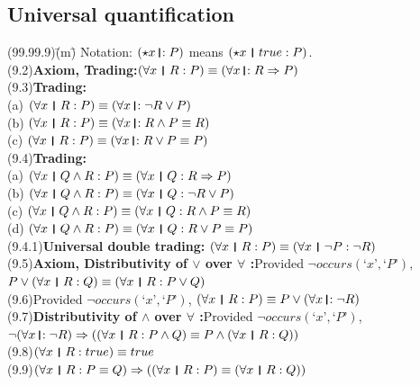 \documentclass{amsart}
\newcommand{\lgap}{2pt}                             %
\newcommand{\impl}{\ensuremath{\Rightarrow}}        %
\newcommand{\thedr}{\rule[-.25ex]{.32mm}{1.75ex}}   %
\newcommand{\dr}{\;\,\thedr\,\;}                    %
\newcommand{\rb}{:}                                 %
\newcommand{\drrb}{\;\thedr\,{:}\;}                 %
\newcommand{\all}{\forall}                          %
\newcommand{\Lq}{\mbox{`}}
\newcommand{\Rq}{\mbox{'}}
\begin{document}
\subsection*{Universal quantification}
\begin{tabbing}
(99.99.9)\;\=(m)\;\=\kill
Notation: $(\star x\drrb P)$ means $(\star x\dr true\rb P)$.\\[\lgap]
(9.2)\>\textbf{Axiom, Trading:}\quad $(\all x\dr R\rb P)\equiv (\all x\drrb R\impl P)$\\[\lgap]
(9.3)\>\textbf{Trading:}\\[\lgap]
      \> (a)\> $(\all x\dr R\rb P)\equiv (\all x\drrb \neg R\lor P)$\\[\lgap]
      \> (b)\> $(\all x\dr R\rb P)\equiv (\all x\drrb R\land P\equiv R)$\\[\lgap]
      \> (c)\> $(\all x\dr R\rb P)\equiv (\all x\drrb R\lor P\equiv P)$\\[\lgap]
(9.4)\>\textbf{Trading:}\\[\lgap]
      \> (a)\> $(\all x\dr Q\land R\rb P)\equiv (\all x\dr Q\rb R\impl P)$\\[\lgap]
      \> (b)\> $(\all x\dr Q\land R\rb P)\equiv (\all x\dr Q\rb \neg R\lor P)$\\[\lgap]
      \> (c)\> $(\all x\dr Q\land R\rb P)\equiv (\all x\dr Q\rb R\land P\equiv R)$\\[\lgap]
      \> (d)\> $(\all x\dr Q\land R\rb P)\equiv (\all x\dr Q\rb R\lor P\equiv P)$\\[\lgap]
(9.4.1)\>\textbf{Universal double trading:} \quad $(\all x\dr R\rb P)\equiv (\all x\dr \neg P \rb \neg R)$\\[\lgap]
(9.5)\>\textbf{Axiom, Distributivity of $\lor$ over $\all$ :}\quad Provided $\neg occurs(\Lq x\Rq ,\Lq P\Rq)$,\\[\lgap]
      \>$P\lor (\all x\dr R\rb Q)\equiv (\all x\dr R\rb P\lor Q)$\\[\lgap]
(9.6)\>Provided $\neg occurs(\Lq x\Rq ,\Lq P\Rq)$, \quad $(\all x\dr R\rb P)\equiv P\lor (\all x\drrb \neg R)$\\[\lgap]
(9.7)\>\textbf{Distributivity of $\land$ over $\all$ :}\quad Provided $\neg occurs(\Lq x\Rq ,\Lq P\Rq)$,\\[\lgap]
      \>$\neg (\all x\drrb \neg R)\impl ((\all x\dr R\rb P\land Q)\equiv P\land (\all x\dr R\rb Q))$\\[\lgap]
(9.8)\>$(\all x\dr R\rb true)\equiv true$\\[\lgap]
(9.9)\>$(\all x\dr R\rb P\equiv Q)\impl ((\all x\dr R\rb P)\equiv (\all x\dr R\rb Q))$\\[\lgap]

\end{tabbing}
\end{document}

